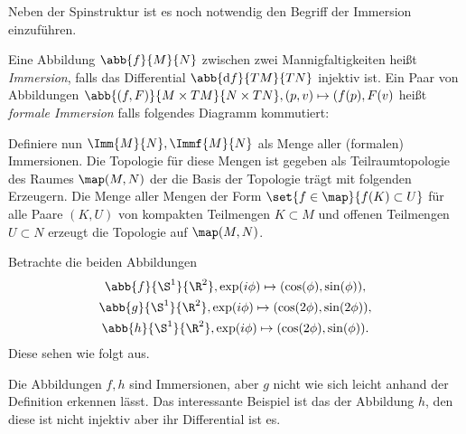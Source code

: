 
Neben der Spinstruktur ist es noch notwendig den Begriff der Immersion 
einzuführen.

\begin{Def}
	Eine Abbildung $\abb{f}{M}{N}$ zwischen zwei Mannigfaltigkeiten
	heißt \textit{Immersion}, falls das Differential $\abb{\mathrm{d} f}{TM}{TN}$ 
	injektiv ist.
	Ein Paar von Abbildungen $\abb{(f,F)}{M \times TM}{N \times TN} ,%
	(p,v) \mapsto (f(p),F(v)$ heißt \textit{formale Immersion} falls folgendes
	Diagramm kommutiert:
	\begin{center}
		
		
	\end{center}
	
	Definiere nun $\Imm{M}{N},\Immf{M}{N}$ als Menge aller (formalen) Immersionen. Die Topologie für diese Mengen ist gegeben als Teilraumtopologie des Raumes $\map(M,N)$ der die Basis der Topologie 
	trägt mit folgenden Erzeugern. Die Menge aller Mengen der Form $\set{f \in \map}{ f(K) \subset U}$
	für alle Paare $(K,U)$ von kompakten Teilmengen $K \subset M$ und
	offenen Teilmengen $U \subset N$ erzeugt die Topologie auf $\map(M,N)$.
\end{Def}


\begin{Bsp}
	Betrachte die beiden Abbildungen 
	\begin{gather*}
		\abb{f}{\S^1}{\R^2}, \exp(i\phi)%
		\mapsto (\cos(\phi),\sin(\phi)),\\
		\abb{g}{\S^1}{\R^2}, \exp(i\phi)%
		\mapsto (\cos(2\phi),\sin(2\phi)),\\
		\abb{h}{\S^1}{\R^2}, \exp(i\phi)%
		\mapsto (\cos(2\phi),\sin(\phi)).
	\end{gather*}
	Diese sehen wie folgt aus.\\
	
	Die Abbildungen $f,h$ sind Immersionen, aber $g$ nicht wie sich leicht
	anhand der Definition erkennen lässt. Das interessante Beispiel ist
	das der Abbildung $h$, den diese ist nicht injektiv aber ihr Differential
	ist es.
\end{Bsp}

